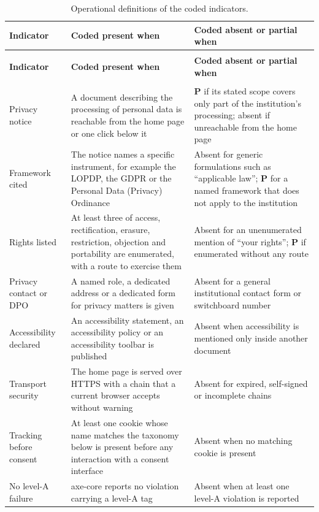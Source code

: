 \documentclass[pdflatex,sn-basic,Numbered,iicol]{sn-jnl}
\theoremstyle{thmstyleone}
\theoremstyle{thmstyletwo}
\theoremstyle{thmstylethree}
\begin{document}
\begin{appendices}
		\footnotesize
		\begin{longtable}{@{}>{\RaggedRight}p{2.7cm}>{\RaggedRight}p{4.75cm}>{\RaggedRight\arraybackslash}p{4.55cm}@{}}
			\caption{Operational definitions of the coded indicators.}\label{tab:codebook}\\
			\toprule
			\textbf{Indicator} & \textbf{Coded present when} & \textbf{Coded absent or partial when} \\
			\midrule
			\endfirsthead
			\multicolumn{3}{c}{\textit{(Table~\ref{tab:codebook}, continued)}}\\
			\toprule
			\textbf{Indicator} & \textbf{Coded present when} & \textbf{Coded absent or partial when} \\
			\midrule
			\endhead
			\midrule
			\multicolumn{3}{r}{\textit{Continued on next page}}\\
			\endfoot
			\bottomrule
			\endlastfoot
			Privacy notice & A document describing the processing of personal data is reachable from the home page or one click below it & \textbf{P} if its stated scope covers only part of the institution's processing; absent if unreachable from the home page \\
			\addlinespace
			Framework cited & The notice names a specific instrument, for example the LOPDP, the GDPR or the Personal Data (Privacy) Ordinance & Absent for generic formulations such as ``applicable law''; \textbf{P} for a named framework that does not apply to the institution \\
			\addlinespace
			Rights listed & At least three of access, rectification, erasure, restriction, objection and portability are enumerated, with a route to exercise them & Absent for an unenumerated mention of ``your rights''; \textbf{P} if enumerated without any route \\
			\addlinespace
			Privacy contact or DPO & A named role, a dedicated address or a dedicated form for privacy matters is given & Absent for a general institutional contact form or switchboard number \\
			\addlinespace
			Accessibility declared & An accessibility statement, an accessibility policy or an accessibility toolbar is published & Absent when accessibility is mentioned only inside another document \\
			\addlinespace
			Transport security & The home page is served over HTTPS with a chain that a current browser accepts without warning & Absent for expired, self-signed or incomplete chains \\
			\addlinespace
			Tracking before consent & At least one cookie whose name matches the taxonomy below is present before any interaction with a consent interface & Absent when no matching cookie is present \\
			\addlinespace
			No level-A failure & axe-core reports no violation carrying a level-A tag & Absent when at least one level-A violation is reported \\
		\end{longtable}
		\normalsize
		

\end{appendices}
\end{document}
